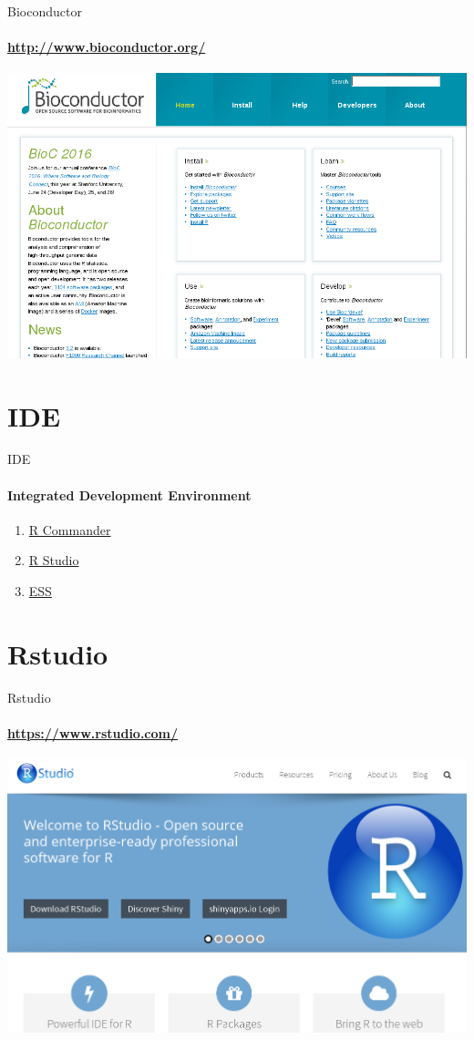 \documentclass[12pt]{beamer}
\begin{document}
\begin{frame}{Bioconductor}
\framesubtitle{\url{http://www.bioconductor.org/}}
\begin{center}
\href{http://www.bioconductor.org/}{\includegraphics[scale=0.35]{images/image4}}
\end{center}
\end{frame}

\section{IDE}
\begin{frame}{IDE}
\framesubtitle{Integrated Development Environment
}
\begin{enumerate}[<+->]
\item \href{http://www.rcommander.com/}{R Commander}
\item \href{https://www.rstudio.com/}{R Studio}
\item \href{http://ess.r-project.org/}{ESS}
\end{enumerate}
\end{frame}
\section{Rstudio}
\begin{frame}{Rstudio}
\framesubtitle{\url{https://www.rstudio.com/}}
\begin{center}
\href{https://www.rstudio.com/}{\includegraphics[scale=0.35]{images/image5}}
\end{center}
\end{frame}
\end{document}
